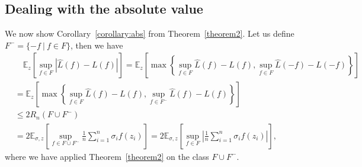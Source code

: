\documentclass[11pt]{article}
\newcommand{\exu}[2]{\mathbb{E}_{#1}\left[{#2}\right]}
\begin{document}
\subsection{Dealing with the absolute value}
\label{section:abs}
We now show Corollary~\ref{corollary:abs} from Theorem~\ref{theorem2}. Let us define $F^-=\{-f~|~f\in F\}$, then we have
\begin{align*}
  & \quad \exu{z}{\sup_{f\in F}|\hat{L}(f) - L(f)|} = \exu{z}{\max\left\{\sup_{f\in F}\hat{L}(f) - L(f), \sup_{f\in F}\hat{L}(-f) - L(-f)\right\}} \\
  & = \exu{z}{\max\left\{\sup_{f\in F}\hat{L}(f) - L(f), \sup_{f\in F^-}\hat{L}(f) - L(f)\right\}} \\
  & \le 2R_n(F\cup F^-) \\
  & = 2\exu{\sigma,z}{\sup_{f\in F\cup F^-}\frac{1}{n}\sum_{i=1}^n\sigma_if(z_i)} = 2\exu{\sigma,z}{\sup_{f\in F}\left| \frac{1}{n}\sum_{i=1}^n\sigma_if(z_i)\right| },
\end{align*}
where we have applied Theorem~\ref{theorem2} on the class $F\cup F^-$. 
\end{document}
